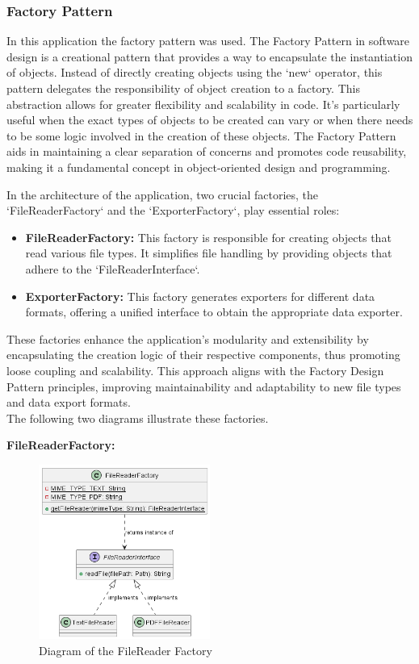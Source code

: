 \subsubsection{Factory Pattern}
In this application the factory pattern was used.
The Factory Pattern in software design is a creational pattern that provides a way to encapsulate the instantiation of objects. Instead of directly creating objects using the `new` operator, this pattern delegates the responsibility of object creation to a factory. This abstraction allows for greater flexibility and scalability in code. It's particularly useful when the exact types of objects to be created can vary or when there needs to be some logic involved in the creation of these objects. The Factory Pattern aids in maintaining a clear separation of concerns and promotes code reusability, making it a fundamental concept in object-oriented design and programming.

In the architecture of the application, two crucial factories, the `FileReaderFactory` and the `ExporterFactory`, play essential roles:

\begin{itemize}
    \item \textbf{FileReaderFactory:} This factory is responsible for creating objects that read various file types. It simplifies file handling by providing objects that adhere to the `FileReaderInterface`.
    \item \textbf{ExporterFactory:} This factory generates exporters for different data formats, offering a unified interface to obtain the appropriate data exporter.
\end{itemize}

These factories enhance the application's modularity and extensibility by encapsulating the creation logic of their respective components, thus promoting loose coupling and scalability. This approach aligns with the Factory Design Pattern principles, improving maintainability and adaptability to new file types and data export formats. \\

The following two diagrams illustrate these factories.
\clearpage

\textbf{FileReaderFactory:} \\

\begin{figure}[h!]
    \center
    \includegraphics[width=0.5\textwidth]{pictures/FileReaderFactory-0.png}
    \caption{Diagram of the FileReader Factory}
    \label{fig:FileReaderFactory_Diagram}
\end{figure}

